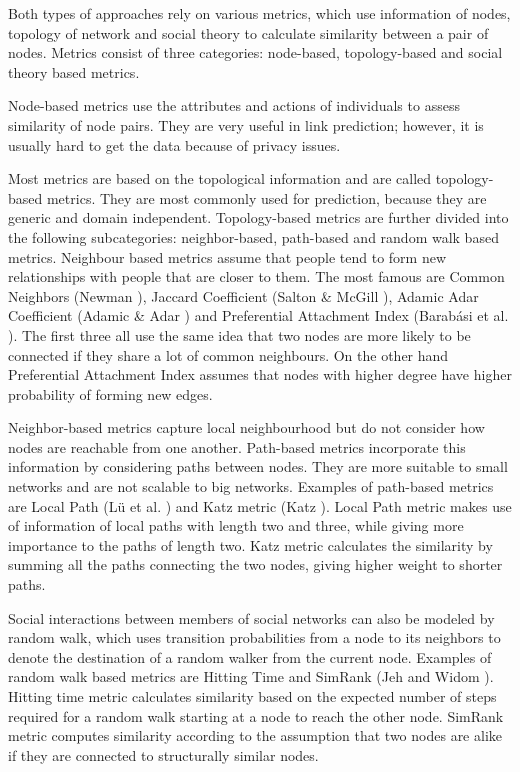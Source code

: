 \documentclass[9pt,twocolumn,twoside]{pnas-new}
\begin{document}
Both types of approaches rely on various metrics, which use information of nodes, topology of network and social theory to calculate similarity between a pair of nodes. Metrics consist of three categories: node-based, topology-based and social theory based metrics. 

Node-based metrics use the attributes and actions of individuals to assess similarity of node pairs. They are very useful in link prediction; however, it is usually hard to get the data because of privacy issues. 

Most metrics are based on the topological information and are called topology-based metrics. They are most commonly used for prediction, because they are generic and domain independent. Topology-based metrics are further divided into the following subcategories: neighbor-based, path-based and random walk based metrics. Neighbour based metrics assume that people tend to form new relationships with people that are closer to them. The most famous are Common Neighbors (Newman \cite{Newman2001}), Jaccard Coefficient (Salton \& McGill \cite{Salton1986}), Adamic Adar Coefficient (Adamic \& Adar \cite{Adamic2003}) and Preferential Attachment Index (Barab{\'a}si et al. \cite{Barabasi2002}). The first three all use the same idea that two nodes are more likely to be connected if they share a lot of common neighbours. On the other hand Preferential Attachment Index assumes that nodes with higher degree have higher probability of forming new edges.

Neighbor-based metrics capture local neighbourhood but do not consider how nodes are reachable from one another. Path-based metrics incorporate this information by considering paths between nodes. They are more suitable to small networks and are not scalable to big networks. Examples of path-based metrics are Local Path (Lü et al. \cite{Lu2009}) and Katz metric (Katz \cite{Katz1953}). Local Path metric makes use of information of local paths with length two and three, while giving more importance to the paths of length two. Katz metric calculates the similarity by summing all the paths connecting the two nodes, giving higher weight to shorter paths.

Social interactions between members of social networks can also be modeled by random walk, which uses transition probabilities from a node to its neighbors to denote the destination of a random walker from the current node. Examples of random walk based metrics are Hitting Time and SimRank (Jeh and Widom \cite{Jeh2002}). Hitting time metric calculates similarity based on the expected number of steps required for a random walk starting at a node to reach the other node. SimRank metric computes similarity according to the assumption that two nodes are alike if they are connected to structurally similar nodes. 
\end{document}

